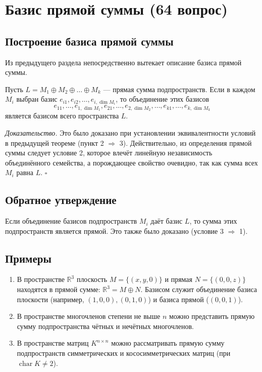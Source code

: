 \documentclass[a4paper,12pt]{article}
\theoremstyle{definition}
\theoremstyle{plain}
\theoremstyle{remark}
\begin{document}
	\newpage
	\section{Базис прямой суммы (64 вопрос)}
	
	\subsection{Построение базиса прямой суммы}
	
	Из предыдущего раздела непосредственно вытекает описание базиса прямой суммы.
	
	\begin{tcolorbox}[colback=red!5, colframe=red!50!black, title=Теорема]
		Пусть \( L = M_1 \oplus M_2 \oplus \dots \oplus M_k \) — прямая сумма подпространств. Если в каждом \( M_i \) выбран базис \( e_{i1}, e_{i2}, \dots, e_{i, \dim M_i} \), то объединение этих базисов
		\[
		e_{11}, \dots, e_{1, \dim M_1}, e_{21}, \dots, e_{2, \dim M_2}, \dots, e_{k1}, \dots, e_{k, \dim M_k}
		\]
		является базисом всего пространства \( L \).
	\end{tcolorbox}
	
	\medskip
	\textit{Доказательство.}
	Это было доказано при установлении эквивалентности условий в предыдущей теореме (пункт 2 \(\Rightarrow\) 3). Действительно, из определения прямой суммы следует условие 2, которое влечёт линейную независимость объединённого семейства, а порождающее свойство очевидно, так как сумма всех \( M_i \) равна \( L \). \hfill \(\square\)
	
	\subsection{Обратное утверждение}
	
	Если объединение базисов подпространств \( M_i \) даёт базис \( L \), то сумма этих подпространств является прямой. Это также было доказано (условие 3 \(\Rightarrow\) 1).
	
	\subsection{Примеры}
	
	\begin{enumerate}
		\item В пространстве \( \mathbb{R}^3 \) плоскость \( M = \{ (x,y,0) \} \) и прямая \( N = \{ (0,0,z) \} \) находятся в прямой сумме: \( \mathbb{R}^3 = M \oplus N \). Базисом служит объединение базиса плоскости (например, \( (1,0,0), (0,1,0) \)) и базиса прямой (\( (0,0,1) \)).
		
		\item В пространстве многочленов степени не выше \( n \) можно представить прямую сумму подпространства чётных и нечётных многочленов.
		
		\item В пространстве матриц \( K^{n \times n} \) можно рассматривать прямую сумму подпространств симметрических и кососимметрических матриц (при \( \operatorname{char} K \neq 2 \)).
	\end{enumerate}
	
\end{document}
